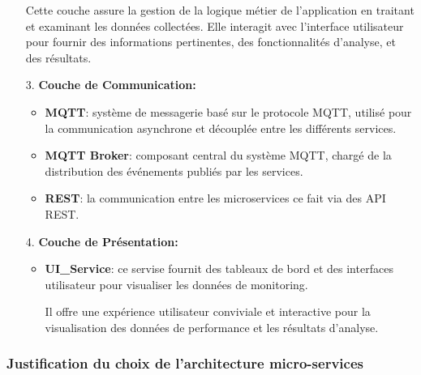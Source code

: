 \begin{enumerate}
\begin{itemize}
            \end{itemize}
                \par Cette couche assure la gestion de la logique métier de l'application en traitant et examinant les données collectées.
                Elle interagit avec l'interface utilisateur pour fournir des informations pertinentes, des fonctionnalités d'analyse, et des résultats.
        \item[3.] \textbf{Couche de Communication: }
                \begin{itemize}
                    \item \textbf{MQTT}: système de messagerie basé sur le protocole MQTT, utilisé pour la communication asynchrone et découplée entre les différents services.
                    \item \textbf{MQTT Broker}: composant central du système MQTT, chargé de la distribution des événements publiés par les services.
                    \item \textbf{REST}: la communication entre les microservices ce fait via des API REST.
                \end{itemize}
            
        \item[4.] \textbf{Couche de Présentation:}
            \begin{itemize}
                \item \textbf{UI\_Service}: ce servise fournit des tableaux de bord et des interfaces utilisateur pour visualiser les données de monitoring.
                \par Il offre une expérience utilisateur conviviale et interactive pour la visualisation des données de performance et les résultats d'analyse.
            \end{itemize}
    \end{enumerate}
\subsubsection{Justification du choix de l'architecture micro-services}

